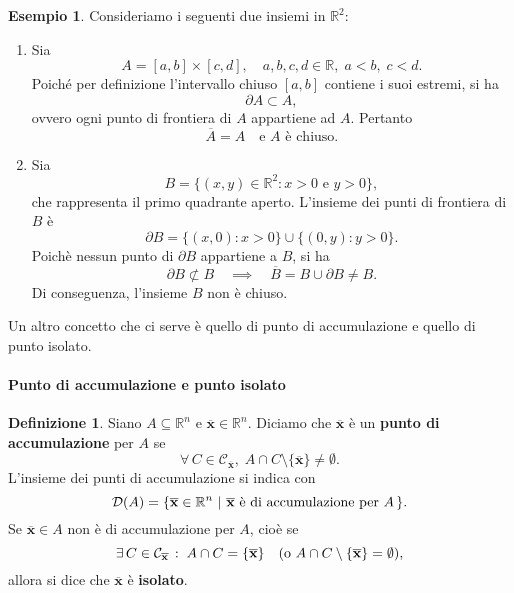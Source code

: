 \documentclass{article}
\theoremstyle{plain}
\theoremstyle{definition}
\newtheorem{defn}{Definizione}[section]
\newtheorem{exmp}{Esempio}[section]
\theoremstyle{remark}
\begin{document}
\begin{exmp}
Consideriamo i seguenti due insiemi in $\mathbb{R}^2$:
\begin{enumerate}
    \item Sia 
    \[
    A = [a,b] \times [c,d], \quad a,b,c,d\in\mathbb{R},\; a<b,\; c<d.
    \]
    Poiché per definizione l'intervallo chiuso $[a,b]$ contiene i suoi estremi, si ha
    \[
    \partial A \subset A,
    \]
    ovvero ogni punto di frontiera di $A$ appartiene ad $A$. Pertanto
    \[
    \overline{A} = A \quad \text{e } A \text{ è chiuso.}
    \]

    \item Sia
    \[
    B = \{(x,y)\in\mathbb{R}^2 : x>0 \text{ e } y>0\},
    \]
    che rappresenta il primo quadrante aperto. L'insieme dei punti di frontiera di $B$ è
    \[
    \partial B = \{(x,0) : x>0\}\cup\{(0,y) : y>0\}.
    \]
    Poichè nessun punto di $\partial B$ appartiene a $B$, si ha
    \[
    \partial B \not\subset B \quad \implies \quad \overline{B} = B\cup \partial B \neq B.
    \]
    Di conseguenza, l'insieme $B$ non è chiuso.
\end{enumerate}
\end{exmp}

\vspace{10pt}

Un altro concetto che ci serve è quello di punto di accumulazione e quello di punto isolato. 

\vspace{10pt}

\paragraph{Punto di accumulazione e punto isolato}
\begin{bxthm}
\begin{defn}
    Siano $A\subseteq\mathbb{R}^n$ e $\overline{\mathbf{x}}\in\mathbb{R}^n$. Diciamo che $\overline{\mathbf{x}}$ 
    è un \textbf{punto di accumulazione} per $A$ se \[\forall\,C\in\mathcal{C}_{\overline{\mathbf{x}}},\;A\cap C\setminus\{\overline{\mathbf{x}}\}\neq\emptyset.\]
    L'insieme dei punti di accumulazione si indica con \[\mathcal{D}(A)=\{\overline{\mathbf{x}}\in\mathbb{R}^n \ | \ \overline{\mathbf{x}} \textup{ è di accumulazione per }A\,\}.\]
    Se $\overline{\mathbf{x}}\in A$ non è di accumulazione per $A$, cioè se 
    \[\exists\,C\in\mathcal{C}_{\overline{\mathbf{x}}}\,:\;A\cap C=\{\overline{\mathbf{x}}\} \quad (\textup{o }A\cap C\setminus\{\overline{\mathbf{x}}\}=\emptyset), \]
    allora si dice che $\overline{\mathbf{x}}$ è \textbf{isolato}.
\end{defn}
\end{bxthm}
\end{document}
